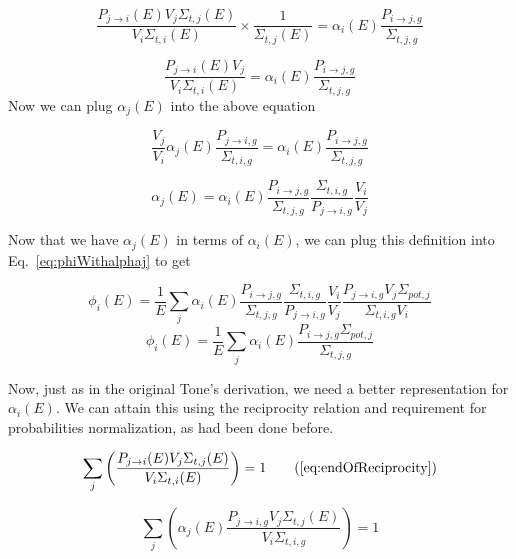 \documentclass[10pt]{article}
\begin{document}
\begin{equation}\frac{P_{j\rightarrow i}(E)V_{j}\Sigma_{t,j}(E)}{V_{i}\Sigma_{t,i}(E)}\times\frac{1}{\Sigma_{t,j}(E)}=\alpha_{i}(E)\frac{P_{i\rightarrow j,g}}{\Sigma_{t,j,g}}\end{equation}

\begin{equation}\frac{P_{j\rightarrow i}(E)V_{j}}{V_{i}\Sigma_{t,i}(E)}=\alpha_{i}(E)\frac{P_{i\rightarrow j,g}}{\Sigma_{t,j,g}}\end{equation}
  Now we can plug $\alpha_j(E)$ into the above equation

\begin{equation}\frac{V_{j}}{V_{i}}\alpha_{j}(E)\frac{P_{j\rightarrow i,g}}{\Sigma_{t,i,g}}=\alpha_{i}(E)\frac{P_{i\rightarrow j,g}}{\Sigma_{t,j,g}}\end{equation}
  
\begin{equation}\alpha_{j}(E)=\alpha_{i}(E)\frac{P_{i\rightarrow j,g}}{\Sigma_{t,j,g}}\frac{\Sigma_{t,i,g}}{P_{j\rightarrow i,g}}\frac{V_{i}}{V_{j}}\end{equation}

  Now that we have $\alpha_j(E)$ in terms of $\alpha_i(E)$, we can plug this definition into Eq.~\ref{eq:phiWithalphaj} to get 

\begin{equation}\phi_{i}(E)=\frac{1}{E}\sum\limits_j\alpha_{i}(E)\frac{P_{i\rightarrow j,g}}{\Sigma_{t,j,g}}\frac{\Sigma_{t,i,g}}{P_{j\rightarrow i,g}}\frac{V_{i}}{V_{j}}\frac{P_{j\rightarrow i,g}V_{j}\Sigma_{pot,j}}{\Sigma_{t,i,g}V_{i}}\end{equation}
  \begin{equation}\phi_{i}(E)=\frac{1}{E}\sum\limits_j\alpha_{i}(E)\frac{P_{i\rightarrow j,g}\Sigma_{pot,j}}{\Sigma_{t,j,g}}\label{eq:again}\end{equation}


Now, just as in the original Tone's derivation, we need a better representation for $\alpha_i(E)$. We can attain this using the reciprocity relation and requirement for probabilities normalization, as had been done before.

  \begin{equation}\sum\limits_{j}\left(\frac{P_{j\rightarrow i}(E)V_{j}\Sigma_{t,j}(E)}{V_{i}\Sigma_{t,i}(E)}\right)=1\tag{\ref{eq:endOfReciprocity}}\end{equation}

    
    \begin{equation}\sum\limits_{j}\left(\alpha_j(E)\frac{P_{j\rightarrow i,g}V_{j}\Sigma_{t,j}(E)}{V_{i}\Sigma_{t,i,g}}\right)=1\end{equation}
\end{document}
